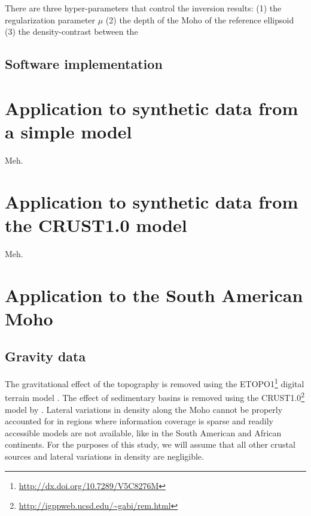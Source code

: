 \documentclass[extra,mreferee]{gji}
\begin{document}
There are three hyper-parameters that control the inversion results:
(1) the regularization parameter $\mu$
(2) the depth of the Moho of the reference ellipsoid
(3) the density-contrast between the

\subsection{Software implementation}


\section{Application to synthetic data from a simple model}


Meh.


\section{Application to synthetic data from the CRUST1.0 model}

Meh.


\section{Application to the South American Moho}


\subsection{Gravity data}

The gravitational effect of the topography
is removed using the
ETOPO1\footnote{\url{http://dx.doi.org/10.7289/V5C8276M}}
digital terrain model
\citep{amante2009}.
The effect of sedimentary basins is removed using the
CRUST1.0\footnote{\url{http://igppweb.ucsd.edu/~gabi/rem.html}} model
by
\citet{laske2013}.
Lateral variations in density along the Moho cannot be properly accounted for
in regions where information coverage is sparse and readily accessible models
are not available, like in the South American and African continents.
For the purposes of this study, we will assume that all other crustal sources
and lateral variations in density are negligible.
\end{document}
